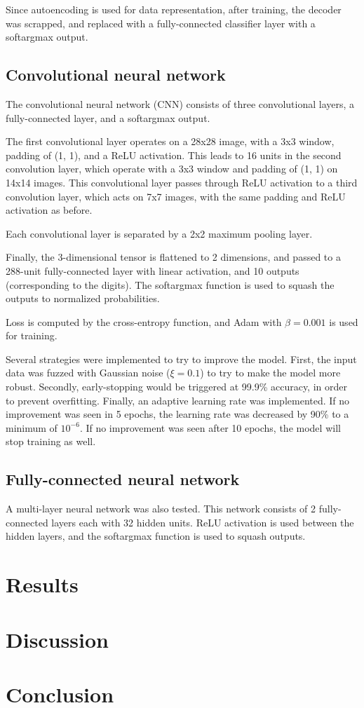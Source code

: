 \documentclass{article}
\begin{document}
Since autoencoding is used for data representation, after training,
the decoder was scrapped, and replaced with a fully-connected classifier layer with a softargmax output.

\subsection{Convolutional neural network}

The convolutional neural network (CNN) consists of three convolutional layers,
a fully-connected layer, and a softargmax output.

The first convolutional layer operates on a 28x28 image, with a 3x3 window,
padding of (1, 1), and a ReLU activation.
This leads to 16 units in the second convolution layer,
which operate with a 3x3 window and padding of (1, 1) on 14x14 images.
This convolutional layer passes through ReLU activation to a third convolution layer,
which acts on 7x7 images, with the same padding and ReLU activation as before.

Each convolutional layer is separated by a 2x2 maximum pooling layer.

Finally, the 3-dimensional tensor is flattened to 2 dimensions,
and passed to a 288-unit fully-connected layer with linear activation,
and 10 outputs (corresponding to the digits).
The softargmax function is used to squash the outputs to normalized probabilities.

Loss is computed by the cross-entropy function, and Adam with $\beta = 0.001$
is used for training.

Several strategies were implemented to try to improve the model.
First, the input data was fuzzed with Gaussian noise ($\xi = 0.1$)
to try to make the model more robust.
Secondly, early-stopping would be triggered at 99.9\% accuracy,
in order to prevent overfitting.
Finally, an adaptive learning rate was implemented.
If no improvement was seen in 5 epochs, the learning rate was decreased by 90\%
to a minimum of $10^{-6}$.
If no improvement was seen after 10 epochs, the model will stop training as well.

\subsection{Fully-connected neural network}

A multi-layer neural network was also tested.
This network consists of 2 fully-connected layers each with 32 hidden units.
ReLU activation is used between the hidden layers,
and the softargmax function is used to squash outputs.

\section{Results}

\section{Discussion}

\section{Conclusion}


\end{document}
